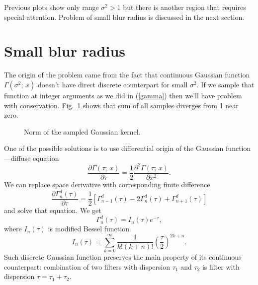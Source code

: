 \documentclass[10pt]{article}
\begin{document}
Previous plots show only range $\sigma^2 > 1$ but there is another region that requires special
attention. Problem of small blur radius is discussed in the next section.


\section{Small blur radius}

The origin of the problem came from the fact that continuous Gaussian function
$\Gamma(\sigma^2;\, x)$ doesn't have direct discrete counterpart for small $\sigma^2$. If we sample
that function at integer arguments as we did in (\ref{gamma}) then we'll have problem with
conservation. Fig.~\ref{norm} shows that sum of all samples diverges from 1 near zero.

\begin{wrapfigure}{r}{0pt}
    \caption{Norm of the sampled Gaussian kernel.}
    \label{norm}
\end{wrapfigure}

One of the possible solutions is to use differential origin of the Gaussian function---diffuse
equation
\begin{equation}
    \frac{\partial\Gamma(\tau;\, x)}{\partial\tau} =
        \frac12 \frac{\partial^2\Gamma(\tau;\, x)}{\partial x^2}.
\end{equation}
We can replace space derivative with corresponding finite difference
\begin{equation}
    \frac{\partial\Gamma^d_n(\tau)}{\partial\tau} =
        \frac12 [\Gamma^d_{n-1}(\tau) - 2\Gamma^d_n(\tau) + \Gamma^d_{n+1}(\tau)]
\end{equation}
and solve that equation. We get
\begin{equation}
    \Gamma^d_n(\tau) = I_n(\tau)e^{-\tau},
\end{equation}
where $I_n(\tau)$ is modified Bessel function
\begin{equation}
    I_n(\tau) = \sum_{k=0}^\infty \frac1{k!(k+n)!}\left(\frac\tau2\right)^{2k+n}.
\end{equation}
Such discrete Gaussian function preserves the main property of its continuous counterpart:
combination of two filters with dispersion $\tau_1$ and $\tau_2$ is filter with dispersion
$\tau = \tau_1 + \tau_2$.
\end{document}
